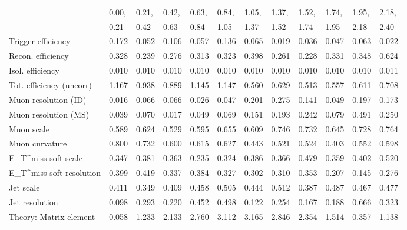 \begin{tabular}{l|p{0.6cm}p{0.6cm}p{0.6cm}p{0.6cm}p{0.6cm}p{0.6cm}p{0.6cm}p{0.6cm}p{0.6cm}p{0.6cm}p{0.6cm}}
\hline
   & 0.00, & 0.21, & 0.42, & 0.63, & 0.84, & 1.05, & 1.37, & 1.52, & 1.74, & 1.95, & 2.18,  \\ 
   & 0.21 & 0.42 & 0.63 & 0.84 & 1.05 & 1.37 & 1.52 & 1.74 & 1.95 & 2.18 & 2.40  \\ 
\hline
Trigger efficiency                       & 0.172 & 0.052 & 0.106 & 0.057 & 0.136 & 0.065 & 0.019 & 0.036 & 0.047 & 0.063 & 0.022 \\
Recon. efficiency                        & 0.328 & 0.239 & 0.276 & 0.313 & 0.323 & 0.398 & 0.261 & 0.228 & 0.331 & 0.348 & 0.624 \\
Isol. efficiency                         & 0.010 & 0.010 & 0.010 & 0.010 & 0.010 & 0.010 & 0.010 & 0.010 & 0.010 & 0.010 & 0.011 \\
Tot. efficiency (uncorr)                 & 1.167 & 0.938 & 0.889 & 1.145 & 1.147 & 0.560 & 0.629 & 0.513 & 0.557 & 0.611 & 0.708 \\
Muon resolution (ID)                     & 0.016 & 0.066 & 0.066 & 0.026 & 0.047 & 0.201 & 0.275 & 0.141 & 0.049 & 0.197 & 0.173 \\
Muon resolution (MS)                     & 0.039 & 0.070 & 0.017 & 0.049 & 0.069 & 0.151 & 0.193 & 0.242 & 0.079 & 0.491 & 0.250 \\
Muon scale                               & 0.589 & 0.624 & 0.529 & 0.595 & 0.655 & 0.609 & 0.746 & 0.732 & 0.645 & 0.728 & 0.764 \\
Muon curvature                           & 0.800 & 0.732 & 0.600 & 0.615 & 0.627 & 0.443 & 0.521 & 0.524 & 0.403 & 0.552 & 0.598 \\
E_{T}^{miss} soft scale                  & 0.347 & 0.381 & 0.363 & 0.235 & 0.324 & 0.386 & 0.366 & 0.479 & 0.359 & 0.402 & 0.520 \\
E_{T}^{miss} soft resolution             & 0.399 & 0.419 & 0.337 & 0.384 & 0.327 & 0.302 & 0.310 & 0.353 & 0.207 & 0.145 & 0.276 \\
Jet scale                                & 0.411 & 0.349 & 0.409 & 0.458 & 0.505 & 0.444 & 0.512 & 0.387 & 0.487 & 0.467 & 0.477 \\
Jet resolution                           & 0.098 & 0.293 & 0.220 & 0.452 & 0.498 & 0.122 & 0.254 & 0.167 & 0.188 & 0.666 & 0.323 \\
Theory: Matrix element                   & 0.058 & 1.233 & 2.133 & 2.760 & 3.112 & 3.165 & 2.846 & 2.354 & 1.514 & 0.357 & 1.138 \\

\end{tabular}
